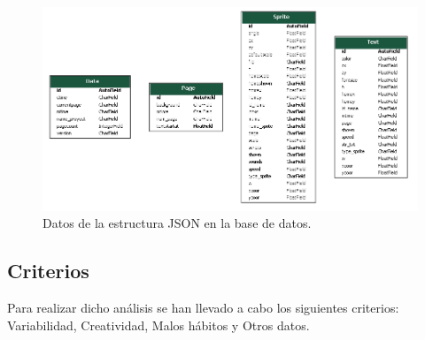 \documentclass[a4paper, 12pt]{book}
\begin{document}
\begin{figure}[H]
  \centering
  \includegraphics[width=16cm, keepaspectratio]{img/bd_json.png}
  \caption{Datos de la estructura JSON en la base de datos.}\label{fig:bd_json}
\end{figure}

\newpage
\subsection{Criterios}
\label{subsec:Criterios}

\vspace{5mm}
Para realizar dicho análisis se han llevado a cabo los siguientes criterios: Variabilidad, Creatividad, Malos hábitos y Otros datos.
\end{document}

